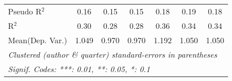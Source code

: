\begin{tabular}{lcccccc}
   Pseudo R$^2$         & 0.16          & 0.15          & 0.15          & 0.18          & 0.19    & 0.18\\  
   R$^2$                & 0.30          & 0.28          & 0.28          & 0.36          & 0.34    & 0.34\\  
Mean(Dep. Var.) & 1.049 & 0.970 & 0.970 & 1.192 & 1.050 & 1.050 \\
   \midrule \midrule
   \multicolumn{7}{l}{\emph{Clustered (author \& quarter) standard-errors in parentheses}}\\
   \multicolumn{7}{l}{\emph{Signif. Codes: ***: 0.01, **: 0.05, *: 0.1}}\\
\end{tabular}
\par\endgroup
